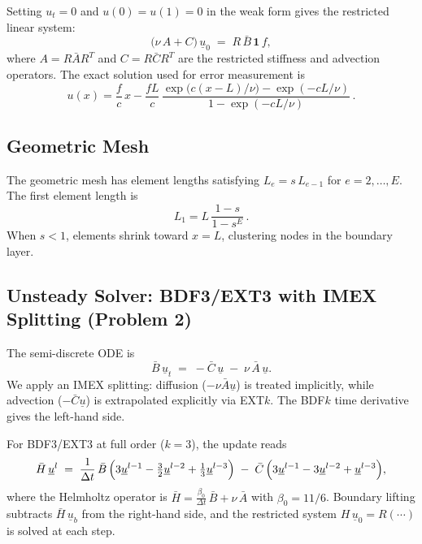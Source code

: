 \documentclass[11pt]{article}
\begin{document}
Setting $u_t = 0$ and $u(0)=u(1)=0$ in the weak form gives the restricted
linear system:
\begin{equation}
  \bigl(\nu\,A + C\bigr)\,\underline{u}_0
  \;=\;
  R\,\bar{B}\,\mathbf{1}\,f,
\end{equation}
where $A = R\bar{A}R^T$ and $C = R\bar{C}R^T$ are the restricted stiffness and
advection operators.  The exact solution used for error measurement is
\begin{equation}\label{eq:exact}
  u(x) = \frac{f}{c}\,x
       - \frac{fL}{c}\,
         \frac{\exp\!\bigl(c(x-L)/\nu\bigr) - \exp(-cL/\nu)}
              {1 - \exp(-cL/\nu)}\,.
\end{equation}

\subsection{Geometric Mesh}

The geometric mesh has element lengths satisfying $L_e = s\,L_{e-1}$ for
$e=2,\dots,E$.  The first element length is
\begin{equation}
  L_1 = L\,\frac{1-s}{1-s^E}\,.
\end{equation}
When $s<1$, elements shrink toward $x=L$, clustering nodes in the boundary
layer.

\subsection{Unsteady Solver: BDF3/EXT3 with IMEX Splitting (Problem 2)}

The semi-discrete ODE is
\begin{equation}
  \bar{B}\,\underline{u}_t \;=\;
  -\bar{C}\,\underline{u} \;-\; \nu\,\bar{A}\,\underline{u}.
\end{equation}
We apply an IMEX splitting: diffusion ($-\nu\bar{A}\underline{u}$) is treated
implicitly, while advection ($-\bar{C}\underline{u}$) is extrapolated
explicitly via EXT$k$.  The BDF$k$ time derivative gives the left-hand side.

For BDF3/EXT3 at full order ($k=3$), the update reads
\begin{equation}\label{eq:bdf3}
  \bar{H}\,\underline{u}^{l}
  \;=\;
  \frac{1}{\Delta t}\,\bar{B}\,
  \Bigl(3\underline{u}^{l-1}
        - \tfrac{3}{2}\underline{u}^{l-2}
        + \tfrac{1}{3}\underline{u}^{l-3}\Bigr)
  \;-\; \bar{C}\,
  \Bigl(3\underline{u}^{l-1}
        - 3\underline{u}^{l-2}
        + \underline{u}^{l-3}\Bigr),
\end{equation}
where the Helmholtz operator is
$\bar{H} = \tfrac{\beta_0}{\Delta t}\,\bar{B} + \nu\,\bar{A}$
with $\beta_0 = 11/6$.
Boundary lifting subtracts $\bar{H}\,\underline{u}_b$ from the right-hand side,
and the restricted system $H\,\underline{u}_0 = R(\cdots)$ is solved at each
step.
\end{document}

